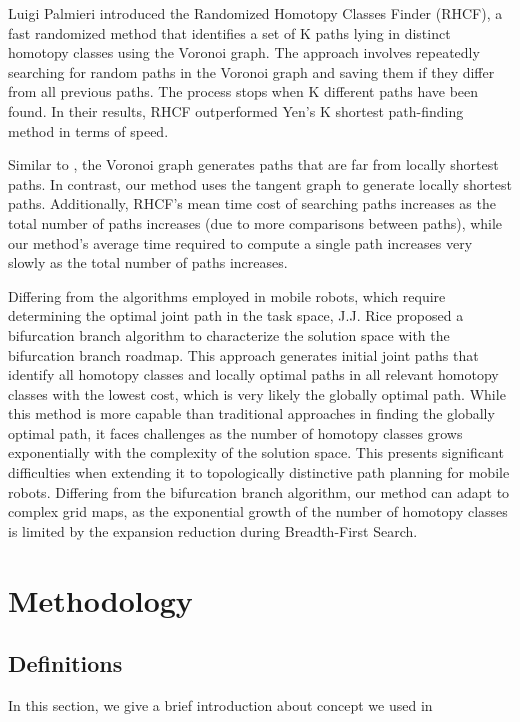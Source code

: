 \documentclass[letterpaper, 10 pt, journal, twoside]{IEEEtran}
\begin{document}
Luigi Palmieri \cite{palmieri2015fast} introduced the Randomized Homotopy Classes Finder (RHCF), a fast randomized method that identifies a set of K paths lying in distinct homotopy classes using the Voronoi graph. The approach involves repeatedly searching for random paths in the Voronoi graph and saving them if they differ from all previous paths. The process stops when K different paths have been found. In their results, RHCF outperformed Yen's K shortest path-finding method \cite{yen1971finding} in terms of speed.

Similar to \cite{kuderer2014online}, the Voronoi graph generates paths that are far from locally shortest paths. In contrast, our method uses the tangent graph to generate locally shortest paths. Additionally, RHCF's mean time cost of searching paths increases as the total number of paths increases (due to more comparisons between paths), while our method's average time required to compute a single path increases very slowly as the total number of paths increases.

Differing from the algorithms employed in mobile robots, which require determining the optimal joint path in the task space, J.J. Rice \cite{rice2020multi} proposed a bifurcation branch algorithm to characterize the solution space with the bifurcation branch roadmap. This approach generates initial joint paths that identify all homotopy classes and locally optimal paths in all relevant homotopy classes with the lowest cost, which is very likely the globally optimal path. While this method is more capable than traditional approaches in finding the globally optimal path, it faces challenges as the number of homotopy classes grows exponentially with the complexity of the solution space. This presents significant difficulties when extending it to topologically distinctive path planning for mobile robots. Differing from the bifurcation branch algorithm, our method can adapt to complex grid maps, as the exponential growth of the number of homotopy classes is limited by the expansion reduction during Breadth-First Search.


\section{Methodology}
\label{Methodology}

\subsection{Definitions}
In this section, we give a brief introduction about concept we used in 
\end{document}

